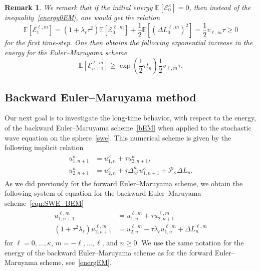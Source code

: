 \documentclass[11pt]{amsart}
\newtheorem{remark}[theorem]{Remark}
\newcommand{\E}{{\mathbb E}}
\newcommand{\IS}{\mathbb{S}}
\newcommand{\cE}{\mathcal E}
\newcommand{\Deltalb}{\Delta_{\IS^2}}
\newcommand{\cP}{\mathcal{P}}
\begin{document}
\begin{remark}
We remark that if the initial energy $\E\left[\mathcal{E}^\kappa_0\right]=0$, then instead of the inequality~\eqref{energy0EM}, one would get the relation
\begin{equation*}
\E\left[\cE_{1}^{\ell,m}\right] = \left(1 + \lambda_\ell\tau^2\right)\E\left[\cE_{0}^{\ell,m}\right]+\frac{1}{2}\E\left[\left(\Delta L^{\ell, m}_0\right)^2\right]=\frac12v_{\ell,m}\tau\geq0
\end{equation*}
for the first time-step. One then obtains the following exponential increase in the energy for the Euler--Maruyama scheme
\begin{equation*}
\E\left[\mathcal{E}^{\ell,m}_{n+1}\right] \geq \exp\left(\frac12\tau t_n\right)\frac12v_{\ell,m}\tau.
\end{equation*}
\end{remark}

\subsection{Backward Euler--Maruyama method}
Our next goal is to investigate the long-time behavior, with respect to the energy, of the backward Euler--Maruyama scheme~\eqref{bEM} when applied to the stochastic wave equation on the sphere~\eqref{swe}. This numerical scheme is given by the following implicit relation
\begin{align}
\begin{split}
    \label{eqn:SWE_BEM}
    u_{1,n+1}^\kappa&=u_{1,n}^\kappa+\tau u_{2,n+1}^\kappa,\\
    u_{2,n+1}^\kappa&=u_{2,n}^\kappa+\tau \Deltalb^\kappa u_{1,n+1}^\kappa+\cP_\kappa\Delta L_n.
\end{split}
\end{align}
As we did previously for the forward Euler--Maruyama scheme, we obtain the following system of equation for the backward Euler--Maruyama scheme~\eqref{eqn:SWE_BEM}
\begin{align}
    \begin{split}
    \label{eqn:SWE_BEM2}
    u_{1,n+1}^{\ell, m} &= u_{1, n}^{\ell, m} + \tau u_{2, n+1}^{\ell, m}\\
    \left(1+\tau^2\lambda_\ell\right)u_{2,n+1}^{\ell, m} &= u_{2, n}^{\ell, m} - \tau\lambda_\ell u_{1, n}^{\ell, m} + \Delta L^{\ell, m}_n
    \end{split}
\end{align}
for $\ell=0,\ldots,\kappa$, $m=-\ell,\ldots,\ell$, and $n\geq 0$. We use the same notation for the energy of the backward Euler--Maruyama scheme as
for the forward Euler--Maruyama scheme, see~\eqref{energEM}.
\end{document}
